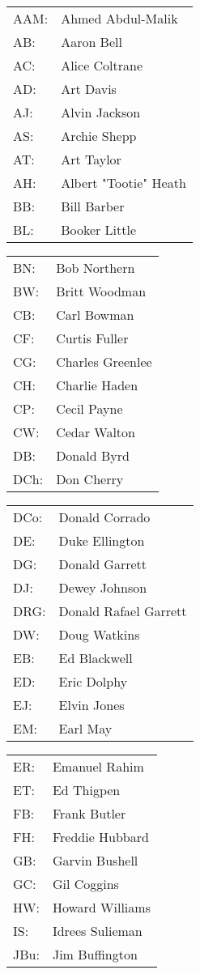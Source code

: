 \documentclass[landscape]{article}
\begin{document}
\vfill

{\small
\newcommand{\split}{\end{tabular}\begin{tabular}{l@{~}l}}
\begin{tabular}{l@{~}l}

AAM:&Ahmed Abdul-Malik\\
AB:&Aaron Bell\\
AC:&Alice Coltrane\\
AD:&Art Davis\\
AJ:&Alvin Jackson\\
AS:&Archie Shepp\\
AT:&Art Taylor\\
AH:&Albert "Tootie" Heath\\
BB:&Bill Barber\\
BL:&Booker Little\\\split
BN:&Bob Northern\\
BW:&Britt Woodman\\
CB:&Carl Bowman\\
CF:&Curtis Fuller\\
CG:&Charles Greenlee\\
CH:&Charlie Haden\\
CP:&Cecil Payne\\
CW:&Cedar Walton\\
DB:&Donald Byrd\\
DCh:&Don Cherry\\\split
DCo:&Donald Corrado\\
DE:&Duke Ellington\\
DG:&Donald Garrett\\
DJ:&Dewey Johnson\\
DRG:&Donald Rafael Garrett\\
DW:&Doug Watkins\\
EB:&Ed Blackwell\\
ED:&Eric Dolphy\\
EJ:&Elvin Jones\\
EM:&Earl May\\\split
ER:&Emanuel Rahim\\
ET:&Ed Thigpen\\
FB:&Frank Butler\\
FH:&Freddie Hubbard\\
GB:&Garvin Bushell\\
GC:&Gil Coggins\\
HW:&Howard Williams\\
IS:&Idrees Sulieman\\
JBu:&Jim Buffington\\

\end{tabular}}
\end{document}
